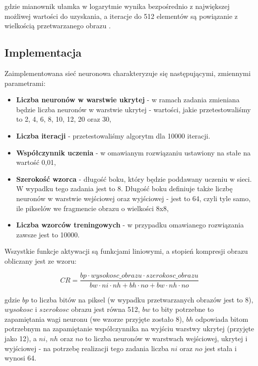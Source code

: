 \documentclass[12pt]{article}
\begin{document}
gdzie mianownik ułamka w logarytmie wynika bezpośrednio z największej możliwej wartości do uzyskania, a iteracje do 512 elementów są powiązanie z wielkością przetwarzanego obrazu \cite{instrukcja}.

\subsection{Implementacja}

Zaimplementowana sieć neuronowa charakteryzuje się następującymi, zmiennymi parametrami:

\begin{itemize}
    \item \textbf{Liczba neuronów w warstwie ukrytej} - w ramach zadania zmieniana będzie liczba neuronów w warstwie ukrytej - wartości, jakie przetestowaliśmy to 2, 4, 6, 8, 10, 12, 20 oraz 30,
    \item \textbf{Liczba iteracji} - przetestowaliśmy algorytm dla 10000 iteracji.
    \item \textbf{Współczynnik uczenia} - w omawianym rozwiązaniu ustawiony na stałe na wartość 0,01,
    \item \textbf{Szerokość wzorca} - długość boku, który będzie poddawany uczeniu w sieci. W wypadku tego zadania jest to 8. Długość boku definiuje także liczbę neuronów w warstwie wejściowej oraz wyjściowej - jest to 64, czyli tyle samo, ile pikselów we fragmencie obrazu o wielkości 8x8, 
    \item \textbf{Liczba wzorców treningowych} - w przypadku omawianego rozwiązania zawsze jest to 10000.
\end{itemize}

Wszystkie funkcje aktywacji są funkcjami liniowymi, a stopień kompresji obrazu obliczany jest ze wzoru:

\begin{equation}
CR = \frac{bp \cdot wysokosc\_obrazu \cdot szerokosc\_obrazu }{bw \cdot ni \cdot nh + bh \cdot no + bw \cdot nh \cdot no}
\end{equation}

gdzie $bp$ to liczba bitów na piksel (w wypadku przetwarzanych obrazów jest to 8), $wysokosc$ i $szerokosc$ obrazu jest równa 512, $bw$ to bity potrzebne to zapamiętania wagi neuronu (we wzorze przyjęte zostało 8), $bh$ odpowiada bitom potrzebnym na zapamiętanie współczynnika na wyjściu warstwy ukrytej (przyjęte jako 12), a $ni$, $nh$ oraz $no$ to liczba neuronów w warstwach wejściowej, ukrytej i wyjściowej - na potrzebę realizacji tego zadania liczba $ni$ oraz $no$ jest stała i wynosi 64.
\end{document}
